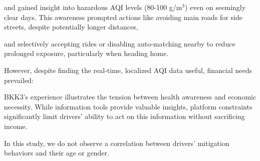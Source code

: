 \qpadding
{}
\qpadding

and gained insight into hazardous AQI levels (80-100 \textmu{}g/m$^3$) even on seemingly clear days. This awareness prompted actions like avoiding main roads for side streets, despite potentially longer distances,

\qpadding
{}
\qpadding

and selectively accepting rides or disabling auto-matching nearby to reduce prolonged exposure, particularly when heading home.


However, despite finding the real-time, localized AQI data useful, financial needs prevailed:

\qpadding
{}
\qpadding

BKK3's experience illustrates the tension between health awareness and economic necessity.
While information tools provide valuable insights, platform constraints significantly limit drivers' ability to act on this information without sacrificing income.

In this study, we do not observe a correlation between drivers' mitigation behaviors and their age or gender.

